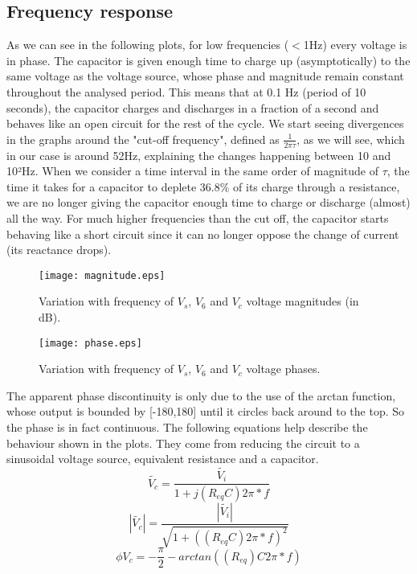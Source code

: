 \subsection{Frequency response}
As we can see in the following plots, for low frequencies ($<$1Hz) every voltage is in phase. The capacitor is given enough time to charge up (asymptotically) to the same voltage as the voltage source, whose phase and magnitude remain constant throughout the analysed period. This means that at 0.1 Hz (period of 10 seconds), the capacitor charges and discharges in a fraction of a second and behaves like an open circuit for the rest of the cycle. We start seeing divergences in the graphs around the "cut-off frequency", defined as $\frac{1}{2\pi\tau}$, as we will see, which in our case is around 52Hz, explaining the changes happening between 10 and 10²Hz. When we consider a time interval in the same order of magnitude of $\tau$, the time it takes for a capacitor to deplete 36.8\% of its charge through a resistance, we are no longer giving the capacitor enough time to charge or discharge (almost) all the way. For much higher frequencies than the cut off, the capacitor starts behaving like a short circuit since it can no longer oppose the change of current (its reactance drops).
\begin{figure}[!h] 
	\centering
\begin{minipage}[b]{0.65\linewidth}	
	\texttt{[image: magnitude.eps]}
\caption{Variation with frequency of $V_{s}$, $V_{6}$ and $V_{c}$ voltage magnitudes (in dB).}
\end{minipage}
\hfill
\begin{minipage}[b]{0.65\linewidth}
\texttt{[image: phase.eps]}
\caption{Variation with frequency of $V_{s}$, $V_{6}$ and $V_{c}$ voltage phases.}
\end{minipage}
\end{figure}
The apparent phase discontinuity is only due to the use of the arctan function, whose output is bounded by [-180,180] until it circles back around to the top. So the phase is in fact continuous.
The following equations help describe the behaviour shown in the plots. They come from reducing the circuit to a sinusoidal voltage source, equivalent resistance and a capacitor.
\begin{equation}
\tilde{V_c}=\frac{\tilde{V_i}}{1+j(R_{eq}C)2\pi*f}
\end{equation}
\begin{equation}
|\tilde{V_c}|=\frac{|\tilde{V_i}|}{\sqrt{1+((R_{eq}C)2\pi*f)^2}}
\end{equation}
\begin{equation}
\phi V_c=-\frac{\pi}{2}-arctan((R_{eq})C2\pi*f)
\end{equation}

